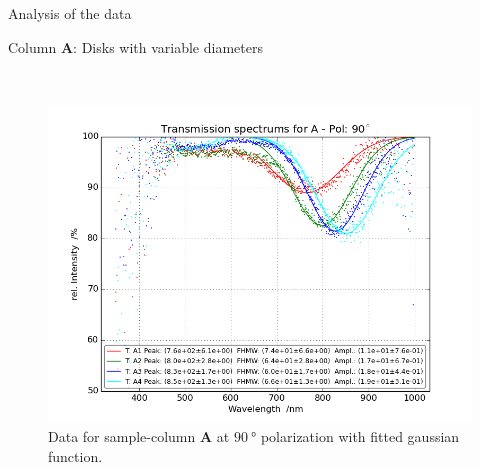 \documentclass[pdftex, a4paper,11pt, twoside, UKenglish]{report}
\begin{document}
\begin{chapter}{Analysis of the data}
\begin{section}{Column \textbf{A}: Disks with variable diameters}
\begin{figure}[ht!]
\begin{minipage}{.95\textwidth}
          \label{fig:TransspecFIT_APol0}
        \end{minipage}\\
        \begin{minipage}{.95\textwidth}
          \centering
          \includegraphics[width=\textwidth]
              {Figures/TransspecFIT_APol90.png}
          \caption{Data for sample-column \textbf{A} at $\SI{90}{\degree}$
              polarization with fitted gaussian function.}
          \label{fig:TransspecFIT_APol90}
        \end{minipage}
      \end{figure}
      
    \end{section}
    
    
    

\end{chapter}
\end{document}

